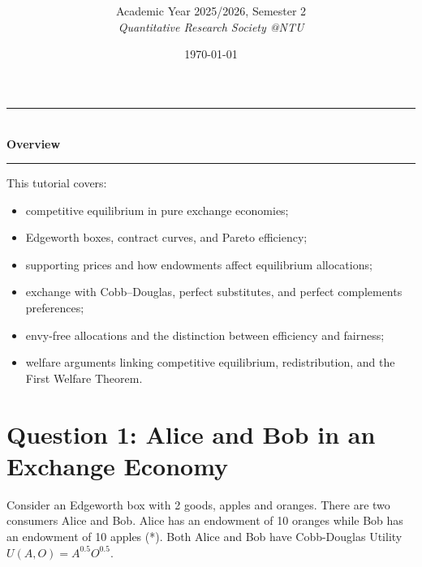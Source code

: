 \documentclass[12pt]{article}
\title{
\CourseCode \CourseName \\[0.3em]
\large \DocType
}
\author{
  Academic Year 2025/2026, Semester 2 \\[0.25em]
  \textit{Quantitative Research Society @NTU}
}
\date{\today}
\begin{document}
\maketitle
\thispagestyle{plainfirst}
\pagestyle{main}
\bigskip

\begin{center}
  \rule{0.8\textwidth}{0.4pt}\\[4pt]
  \textbf{Overview}\\[2pt]
  \rule{0.8\textwidth}{0.4pt}
\end{center}

\noindent
This tutorial covers:
\begin{itemize}[leftmargin=*]
  \item competitive equilibrium in pure exchange economies;
  \item Edgeworth boxes, contract curves, and Pareto efficiency;
  \item supporting prices and how endowments affect equilibrium allocations;
  \item exchange with Cobb--Douglas, perfect substitutes, and perfect complements preferences;
  \item envy-free allocations and the distinction between efficiency and fairness;
  \item welfare arguments linking competitive equilibrium, redistribution, and the First Welfare Theorem.
\end{itemize}

\bigskip

\newpage
\tableofcontents

\newpage
\section{Question 1: Alice and Bob in an Exchange Economy}

\noindent
Consider an Edgeworth box with 2 goods, apples and oranges. There are two consumers Alice and Bob. Alice has an endowment of 10 oranges while Bob has an endowment of 10 apples (*). Both Alice and Bob have Cobb-Douglas Utility \(U(A,O)=A^{0.5}O^{0.5}\).
\end{document}

